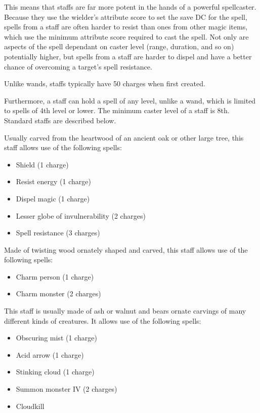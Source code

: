 This means that staffs are far more potent in the hands of a powerful spellcaster. Because they use the wielder's attribute score to set the save DC for the spell, spells from a staff are often harder to resist than ones from other magic items, which use the minimum attribute score required to cast the spell. Not only are aspects of the spell dependant on caster level (range, duration, and so on) potentially higher, but spells from a staff are harder to dispel and have a better chance of overcoming a target's spell resistance.

Unlike wands, staffs typically have 50 charges when first created.

Furthermore, a staff can hold a spell of any level, unlike a wand, which is limited to spells of 4th level or lower. The minimum caster level of a staff is 8th. Standard staffs are described below.

 Usually carved from the heartwood of an ancient oak or other large tree, this staff allows use of the following spells:
\begin{itemize}
\item Shield (1 charge)
\item Resist energy (1 charge)
\item Dispel magic (1 charge)
\item Lesser globe of invulnerability (2 charges)
\item Spell resistance (3 charges)
\end{itemize}


 Made of twisting wood ornately shaped and carved, this staff allows use of the following spells:
\begin{itemize}
\item Charm person (1 charge)
\item Charm monster (2 charges)
\end{itemize}


 This staff is usually made of ash or walnut and bears ornate carvings of many different kinds of creatures. It allows use of the following spells:
\begin{itemize}
\item Obscuring mist (1 charge)
\item Acid arrow (1 charge)
\item Stinking cloud (1 charge)
\item Summon monster IV (2 charges)
\item Cloudkill 
\end{itemize}

